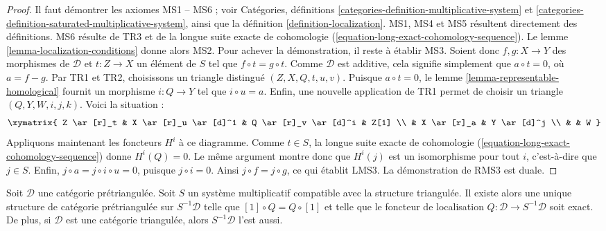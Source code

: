 \begin{proof}
Il faut démontrer les axiomes MS1 -- MS6 ; voir Catégories, définitions
\ref{categories-definition-multiplicative-system} et
\ref{categories-definition-saturated-multiplicative-system}, ainsi que la
définition \ref{definition-localization}.
MS1, MS4 et MS5 résultent directement des définitions.
MS6 résulte de TR3 et de la longue suite exacte de cohomologie
(\ref{equation-long-exact-cohomology-sequence}).
Le lemme \ref{lemma-localization-conditions} donne alors MS2. Pour achever la
démonstration, il reste à établir MS3. Soient donc $f, g : X \to Y$ des
morphismes de $\mathcal{D}$ et $t : Z \to X$ un élément de $S$ tel que
$f \circ t = g \circ t$. Comme $\mathcal{D}$ est additive, cela signifie
simplement que $a \circ t = 0$, où $a = f - g$. Par TR1 et TR2, choisissons un
triangle distingué $(Z, X, Q, t, u, v)$. Puisque $a \circ t = 0$, le
lemme \ref{lemma-representable-homological} fournit un morphisme
$i : Q \to Y$ tel que $i \circ u = a$. Enfin, une nouvelle application de TR1
permet de choisir un triangle $(Q, Y, W, i, j, k)$. Voici la situation :
$$
\xymatrix{
Z \ar[r]_t & X \ar[r]_u \ar[d]^1 & Q \ar[r]_v \ar[d]^i & Z[1] \\
& X \ar[r]_a & Y \ar[d]^j \\
& & W
}
$$
Appliquons maintenant les foncteurs $H^i$ à ce diagramme.
Comme $t \in S$, la longue suite exacte de cohomologie
(\ref{equation-long-exact-cohomology-sequence}) donne $H^i(Q) = 0$.
Le même argument montre donc que $H^i(j)$ est un isomorphisme pour tout $i$,
c'est-à-dire que $j \in S$. Enfin, $j \circ a = j \circ i \circ u = 0$,
puisque $j \circ i = 0$. Ainsi $j \circ f = j \circ g$, ce qui établit LMS3.
La démonstration de RMS3 est duale.
\end{proof}

\begin{proposition}
\label{proposition-construct-localization}
Soit $\mathcal{D}$ une catégorie prétriangulée. Soit $S$ un système
multiplicatif compatible avec la structure triangulée.
Il existe alors une unique structure de catégorie prétriangulée sur
$S^{-1}\mathcal{D}$ telle que $[1] \circ Q = Q \circ [1]$ et telle que le
foncteur de localisation $Q : \mathcal{D} \to S^{-1}\mathcal{D}$ soit exact.
De plus, si $\mathcal{D}$ est une catégorie triangulée, alors
$S^{-1}\mathcal{D}$ l'est aussi.
\end{proposition}

